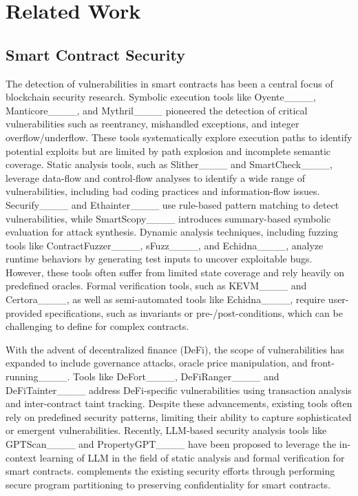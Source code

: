\section{Related Work}
\label{sec:relate}
\subsection{Smart Contract Security}
The detection of vulnerabilities in smart contracts has been a central focus of blockchain security research. Symbolic execution tools like Oyente____, Manticore____, and Mythril____ pioneered the detection of critical vulnerabilities such as reentrancy, mishandled exceptions, and integer overflow/underflow. These tools systematically explore execution paths to identify potential exploits but are limited by path explosion and incomplete semantic coverage. Static analysis tools, such as Slither____ and SmartCheck____, leverage data-flow and control-flow analyses to identify a wide range of vulnerabilities, including bad coding practices and information-flow issues. Securify____ and Ethainter____ use rule-based pattern matching to detect vulnerabilities, while SmartScopy____ introduces summary-based symbolic evaluation for attack synthesis.
Dynamic analysis techniques, including fuzzing tools like ContractFuzzer____, sFuzz____, and Echidna____, analyze runtime behaviors by generating test inputs to uncover exploitable bugs. However, these tools often suffer from limited state coverage and rely heavily on predefined oracles. Formal verification tools, such as KEVM____ and Certora____, as well as semi-automated tools like Echidna____, require user-provided specifications, such as invariants or pre-/post-conditions, which can be challenging to define for complex contracts.

With the advent of decentralized finance (DeFi), the scope of vulnerabilities has expanded to include governance attacks, oracle price manipulation, and front-running____. Tools like DeFort____, DeFiRanger____ and DeFiTainter____ address DeFi-specific vulnerabilities using transaction analysis and inter-contract taint tracking. Despite these advancements, existing tools often rely on predefined security patterns, limiting their ability to capture sophisticated or emergent vulnerabilities.
Recently, LLM-based security analysis tools like GPTScan____ and PropertyGPT____ have been proposed to leverage the in-context learning of LLM in the field of static analysis and formal verification for smart contracts.
\tool complements the existing security efforts through performing secure program partitioning to preserving confidentiality for smart contracts.

